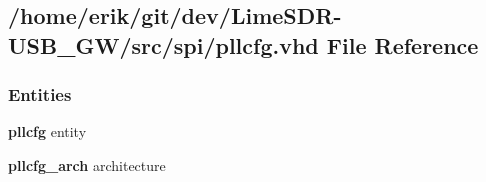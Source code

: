 \subsection{/home/erik/git/dev/\+Lime\+S\+D\+R-\/\+U\+S\+B\+\_\+\+G\+W/src/spi/pllcfg.vhd File Reference}
\label{pllcfg_8vhd}
\subsubsection*{Entities}
\begin{DoxyCompactItemize}
\item 
{\bf pllcfg} entity
\item 
{\bf pllcfg\+\_\+arch} architecture
\end{DoxyCompactItemize}
